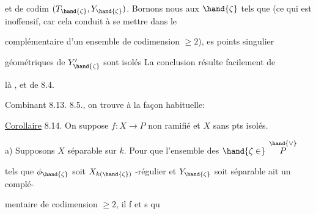 et de codim $(T_{\hand{\zeta}},Y_{\hand{\zeta}})$. Bornons nous aux $\hand{\zeta}$ tels que \hand{)}
\margin{$*$} 
\hand{/}(ce qui est inoffensif, car  cela conduit à se mettre dans le

complémentaire d'un ensemble de codimension $\geq 2$\hand{\unsure{$\zeta$}$\}$}), es points singulier

géométriques de $Y'_{\hand{\zeta}}$ sont  isolés La conclusion résulte facilement de

là , et de 8.4. 

Combinant 8.13.  8.5.\hand{/}, on trouve à la façon habituelle:

\uline{Corollaire} 8.14. On suppose $f:X\rightarrow P$ non ramifié et $X$ sans pts isolés.

 a) Supposons $X$ séparable sur $k$. Pour que l'ensemble  des $\hand{\zeta \in}$ $\overset{\hand{\vee}}{P}$

tels que $\phi_{\hand{\zeta}}$ soit $X_{k(\hand{\zeta})}$ -régulier et $Y_{\hand{\zeta}}$ soit séparable ait un complé-%

mentaire de codimension $\geq 2$, il f et s qu

